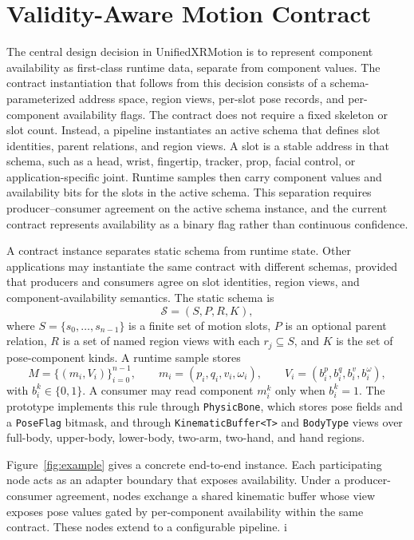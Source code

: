 \documentclass[runningheads]{llncs}
\begin{document}
\section{Validity-Aware Motion Contract}\label{sec:contract}
The central design decision in UnifiedXRMotion is to represent component availability as first-class runtime data, separate from component values. The contract instantiation that follows from this decision consists of a schema-parameterized address space, region views, per-slot pose records, and per-component availability flags. The contract does not require a fixed skeleton or slot count. Instead, a pipeline instantiates an active schema that defines slot identities, parent relations, and region views. A slot is a stable address in that schema, such as a head, wrist, fingertip, tracker, prop, facial control, or application-specific joint. Runtime samples then carry component values and availability bits for the slots in the active schema. This separation requires producer--consumer agreement on the active schema instance, and the current contract represents availability as a binary flag rather than continuous confidence.

A contract instance separates static schema from runtime state. Other applications may instantiate the same contract with different schemas, provided that producers and consumers agree on slot identities, region views, and component-availability semantics. The static schema is
\begin{equation}
	\mathcal{S}=(S,P,R,K),
\end{equation}
where $S=\{s_0,\ldots,s_{n-1}\}$ is a finite set of motion slots, $P$ is an optional parent relation, $R$ is a set of named region views with each $r_j\subseteq S$, and $K$ is the set of pose-component kinds. A runtime sample stores
\begin{equation}
	M=\{(m_i,V_i)\}_{i=0}^{n-1}, \qquad
	m_i=(p_i,q_i,v_i,\omega_i), \qquad
	V_i=(b^p_i,b^q_i,b^v_i,b^\omega_i),
\end{equation}
with $b_i^k\in\{0,1\}$. A consumer may read component $m_i^k$ only when $b_i^k=1$. The prototype implements this rule through \texttt{PhysicBone}, which stores pose fields and a \texttt{PoseFlag} bitmask, and through \texttt{KinematicBuffer<T>} and \texttt{BodyType} views over full-body, upper-body, lower-body, two-arm, two-hand, and hand regions.

%
Figure~\ref{fig:example} gives a concrete end-to-end instance.
Each participating node acts as an adapter boundary that exposes availability. 
Under a producer-consumer agreement, nodes exchange a shared kinematic buffer whose view exposes pose values gated by per-component availability within the same contract.
These nodes extend to a configurable pipeline.
i
\end{document}
